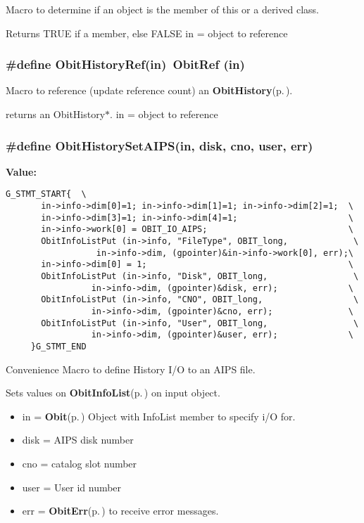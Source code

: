 Macro to determine if an object is the member of this or a derived class. 

Returns TRUE if a member, else FALSE in = object to reference 
\subsubsection{\setlength{\rightskip}{0pt plus 5cm}\#define Obit\-History\-Ref(in)\ Obit\-Ref (in)}\label{ObitHistory_8h_a1}


Macro to reference (update reference count) an {\bf Obit\-History}{\rm (p.\,\pageref{structObitHistory})}. 

returns an Obit\-History$\ast$. in = object to reference 
\subsubsection{\setlength{\rightskip}{0pt plus 5cm}\#define Obit\-History\-Set\-AIPS(in, disk, cno, user, err)}\label{ObitHistory_8h_a4}


{\bf Value:}

\footnotesize\begin{verbatim}G_STMT_START{  \
       in->info->dim[0]=1; in->info->dim[1]=1; in->info->dim[2]=1;  \
       in->info->dim[3]=1; in->info->dim[4]=1;                      \
       in->info->work[0] = OBIT_IO_AIPS;                            \
       ObitInfoListPut (in->info, "FileType", OBIT_long,             \
                  in->info->dim, (gpointer)&in->info->work[0], err);\
       in->info->dim[0] = 1;                                        \
       ObitInfoListPut (in->info, "Disk", OBIT_long,                 \
                 in->info->dim, (gpointer)&disk, err);              \
       ObitInfoListPut (in->info, "CNO", OBIT_long,                  \
                 in->info->dim, (gpointer)&cno, err);               \
       ObitInfoListPut (in->info, "User", OBIT_long,                 \
                 in->info->dim, (gpointer)&user, err);              \
     }G_STMT_END
\end{verbatim}\normalsize 
Convenience Macro to define History I/O to an AIPS file. 

Sets values on {\bf Obit\-Info\-List}{\rm (p.\,\pageref{structObitInfoList})} on input object. \begin{itemize}
\item in = {\bf Obit}{\rm (p.\,\pageref{structObit})} Object with Info\-List member to specify i/O for. \item disk = AIPS disk number \item cno = catalog slot number \item user = User id number \item err = {\bf Obit\-Err}{\rm (p.\,\pageref{structObitErr})} to receive error messages. \end{itemize}
